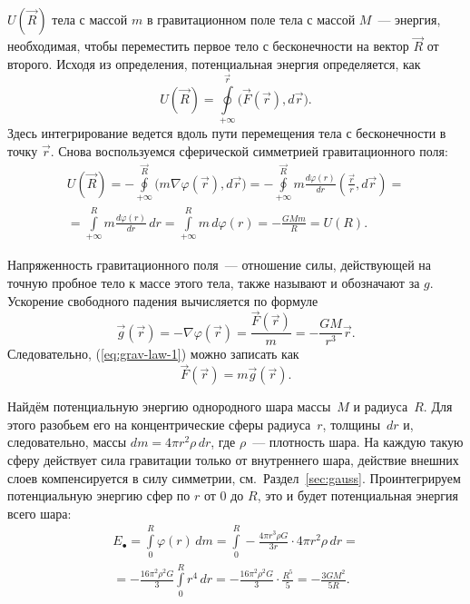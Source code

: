  $U(\vec{R})$ тела с массой $m$ в гравитационном поле тела с массой $M$~--- энергия, необходимая, чтобы переместить первое тело с бесконечности на вектор $\vec{R}$ от второго. Исходя из определения, потенциальная энергия определяется, как
\begin{equation}
    U(\vec R) =  \oint\limits_{+\infty}^\vec{r} \big(\vec F( \vec r),d \vec r\big).
\end{equation}
Здесь интегрирование ведется вдоль пути перемещения тела с бесконечности в точку $\vec{r}$. Снова воспользуемся сферической симметрией гравитационного поля:
\begin{multline}
    U(\vec R) 
    = - \oint\limits_{+\infty}^\vec{R} \big(m \nabla \varphi (\vec{r}), d \vec r\big)
    = - \oint\limits_{+\infty}^\vec{R} m \frac{d \varphi(r)}{d r} \left( \frac{\vec r}{r}, d \vec r \right) = \\
    = \int\limits_{+\infty}^R m \frac{d \varphi(r)}{d r} \,d r 
    = \int\limits_{+\infty}^R m \, d \varphi(r) = -\frac{GMm}{R} = U(R).
\end{multline}

Напряженность гравитационного поля~--- отношение силы, действующей на точную пробное тело к массе этого тела, также называют  и обозначают за $g$. Ускорение свободного падения вычисляется по формуле
\begin{equation}
    \vec g(\vec r) = -\nabla \varphi(\vec r) = \frac{\vec F( \vec r)}{m} = - \frac{GM}{r^3} \vec r.
    \label{eq:g}
\end{equation} 
Следовательно, (\ref{eq:grav-law-1}) можно записать как
\begin{equation}
    \vec F (\vec r) = m \vec g(\vec r).
\end{equation}

Найдём потенциальную энергию однородного шара массы~$M$ и радиуса~$R$. Для этого разобьем его на концентрические сферы радиуса~$r$, толщины~$dr$ и, следовательно, массы $dm = 4 \pi r^2 \rho \, dr$, где $\rho$~--- плотность шара. На каждую такую сферу действует сила гравитации только от внутреннего шара, действие внешних слоев компенсируется в силу симметрии, см.~Раздел~\ref{sec:gauss}. Проинтегрируем потенциальную энергию сфер по $r$ от 0 до $R$, это и будет потенциальная энергия всего шара:
\begin{multline}
    E_\bullet 
        = \int\limits_0^R \varphi(r) \, dm 
        = \int\limits_0^R -\frac{4 \pi r^3 \rho G}{3 r} \cdot 4 \pi r^2 \rho \, dr =\\
        = -\frac{16\pi^2 \rho^2 G}{3} \int\limits_0^R r^4 \, dr 
        = -\frac{16 \pi^2 \rho^2 G}{3} \cdot \frac{R^5}{5} 
        = - \frac{3 G M^2}{5R}.
\end{multline}

